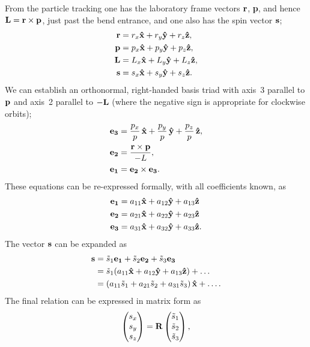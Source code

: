 \documentclass[]{article}
\begin{document}
From the particle tracking one has the laboratory frame
vectors ${\bf r}$, {\bf p}, and hence 
${\bf L}={\bf r}\times {\bf p}$, just past the bend entrance, and
one also has the spin vector ${\bf s}$;
%
\begin{align}
{\bf r} &= r_x{\bf \hat x} + r_y{\bf \hat y} + r_z{\bf \hat z}, \notag\\ 
{\bf p} &= p_x{\bf \hat x} + p_y{\bf \hat y} + p_z{\bf \hat z}, \notag\\ 
{\bf L} &= L_x{\bf \hat x} + L_y{\bf \hat y} + L_z{\bf \hat z}, \notag\\ 
{\bf s} &= s_x{\bf \hat x} + s_y{\bf \hat y} + s_z{\bf \hat z}. 
\label{eq:SpinRot.1}
\end{align}
%
We can establish an orthonormal, right-handed basis triad with axis~3
parallel to ${\bf p}$ and axis~2 parallel to ${\bf -L}$ (where the
negative sign is appropriate for clockwise orbits);
%
\begin{align}
{\bf e_3}
 &= 
  \frac{p_x}{p}\,{\bf \hat x} 
+ \frac{p_y}{p}\,{\bf \hat y} 
+ \frac{p_z}{p}\,{\bf \hat z}, \notag\\
{\bf e_2} &= \frac{{\bf r}\times {\bf p}}{-L}, \notag\\
{\bf e_1} &= {\bf e_2}\times{\bf e_3}.
\label{eq:SpinRot.2}
\end{align}
%
These equations can be re-expressed formally, with all coefficients known, as
%
\begin{align}
{\bf e_1}
 &= 
a_{11}{\bf\hat x}+a_{12}{\bf\hat y}+a_{13}{\bf\hat z}\notag\\
{\bf e_2}
 &= 
a_{21}{\bf\hat x}+a_{22}{\bf\hat y}+a_{23}{\bf\hat z}\notag\\
{\bf e_3}
 &= 
a_{31}{\bf\hat x}+a_{32}{\bf\hat y}+a_{33}{\bf\hat z}.
\label{eq:SpinRot.3}
\end{align}
%
The vector ${\bf s}$ can be expanded as
%
\begin{align}
{\bf s}
 &=
\tilde s_1{\bf e_1} + \tilde s_2{\bf e_2} + \tilde s_3{\bf e_3} \notag\\
 &= \tilde s_1( a_{11}{\bf\hat x}+a_{12}{\bf\hat y}+a_{13}{\bf\hat z}) + \dots \notag\\
 &= (a_{11}\tilde s_1 + a_{21}\tilde s_2 + a_{31}\tilde s_3)\,{\bf\hat x} + \dots.
\label{eq:SpinRot.4}
\end{align}
%
The final relation can be expressed in matrix form as
%
\begin{equation}
\begin{pmatrix} s_x \\ s_y \\ s_z \end{pmatrix}
 =
{\bf R}
\begin{pmatrix} \tilde s_1 \\  \tilde s_2 \\  \tilde s_3 \end{pmatrix},
\label{eq:SpinRot.5}
\end{equation}
\end{document}
